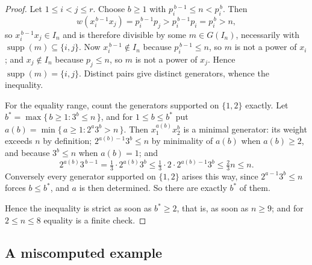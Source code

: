 \documentclass[a4paper,11pt,oneside,reqno]{amsart}
\theoremstyle{definition}
\theoremstyle{remark}
\theoremstyle{plain}
\begin{document}
\begin{proof}
  Let \(1 \le i < j \le r\). Choose \(b \ge 1\) with \(p_i^{\,b-1} \le n < p_i^{\,b}\).
  Then
  \[
    w(x_i^{\,b-1}x_j) = p_i^{\,b-1}p_j > p_i^{\,b-1}p_i = p_i^{\,b} > n,
  \]
  so \(x_i^{\,b-1}x_j \in I_n\) and is therefore divisible by some
  \(m \in G(I_n)\), necessarily with \(\operatorname{supp}(m) \subseteq \{i,j\}\).
  Now \(x_i^{\,b-1} \notin I_n\) because \(p_i^{\,b-1} \le n\), so \(m\) is not a
  power of \(x_i\); and \(x_j \notin I_n\) because \(p_j \le n\), so \(m\) is not
  a power of \(x_j\). Hence \(\operatorname{supp}(m) = \{i,j\}\). Distinct pairs
  give distinct generators, whence the inequality.

  For the equality range, count the generators supported on \(\{1,2\}\)
  exactly. Let \(b^{*} = \max\{\,b \ge 1 : 3^{b} \le n\,\}\), and for
  \(1 \le b \le b^{*}\) put \(a(b) = \min\{\,a \ge 1 : 2^{a}3^{b} > n\,\}\). Then
  \(x_1^{a(b)}x_2^{b}\) is a minimal generator: its weight exceeds \(n\) by
  definition; \(2^{a(b)-1}3^{b} \le n\) by minimality of \(a(b)\) when
  \(a(b) \ge 2\), and because \(3^{b} \le n\) when \(a(b) = 1\); and
  \[
    2^{a(b)}3^{\,b-1} = \tfrac{1}{3} \cdot 2^{a(b)}3^{b}
      \le \tfrac{1}{3} \cdot 2 \cdot 2^{a(b)-1}3^{b} \le \tfrac{2}{3}n \le n .
  \]
  Conversely every generator supported on \(\{1,2\}\) arises this way, since
  \(2^{a-1}3^{b} \le n\) forces \(b \le b^{*}\), and \(a\) is then determined.
  So there are exactly \(b^{*}\) of them.

  Hence the inequality is strict as soon as \(b^{*} \ge 2\), that is, as soon as
  \(n \ge 9\); and for \(2 \le n \le 8\) equality is a finite check.
\end{proof}

\subsection{A miscomputed example}
\end{document}
